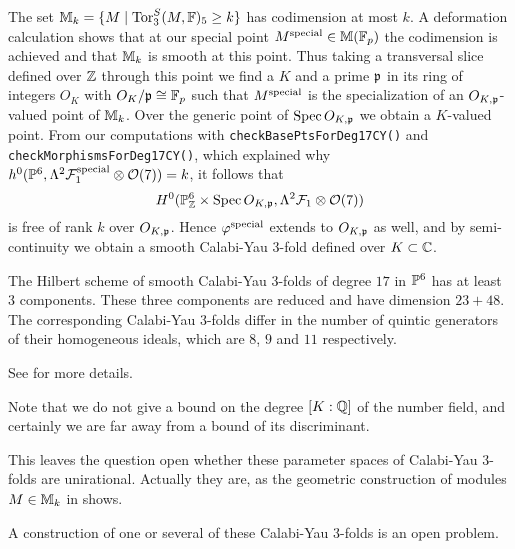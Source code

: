 The set
${\mathbb M}_k=\{ M \mid {\rm{Tor}}^S_3(M,{\mathbb F})_5 \ge k \}$ has codimension at most $k$.
A deformation calculation shows that at our special point
$M^{\rm special} \in {\mathbb M}({\mathbb F}_p)$ the codimension is achieved and that ${\mathbb M}_k$
is smooth at this point. 
Thus taking a transversal slice defined over ${\mathbb Z}$ through this point 
we find a  $K$ and a prime $\mathfrak p$ in its ring of integers $O_K$ 
with $O_K/\mathfrak p \cong {\mathbb F}_p$ such that 
$M^{\rm special}$ is the specialization of an $O_{K,\mathfrak p}$-valued point of ${\mathbb M}_k$. 
Over the generic point of $\operatorname{Spec} O_{K,\mathfrak p}$ we obtain a $K$-valued point. 
From our computations with {\tt checkBasePtsForDeg17CY()} and 
{\tt checkMorphismsForDeg17CY()},
which explained why $h^0({\mathbb P}^6,\Lambda^2 {\mathcal F}_1^{\rm special} \otimes {\mathcal O}(7))=k$,
it follows that 
$$H^0({\mathbb P}^6_{\mathbb Z}\times\operatorname{Spec} O_{K,\mathfrak p},\Lambda^2 {\mathcal F}_1 \otimes {\mathcal O}(7))$$
is free of rank $k$ over $O_{K,\mathfrak p}$.
Hence $\varphi^{\rm special}$ extends to $O_{K,\mathfrak p}$ as well,
and by semi-continuity we obtain a smooth Calabi-Yau 3-fold defined over
$K \subset {\mathbb C}$.

\begin{theorem}[\cite{CO:To}] The Hilbert scheme of smooth Calabi-Yau 3-folds of 
degree $17$ in 
${\mathbb P}^6$ has at least 3 components. These three components are reduced  and 
have dimension $23+48$. The corresponding Calabi-Yau 3-folds differ in the
number of quintic generators of their homogeneous ideals,
which are $8$, $9$ and $11$ respectively.   
\end{theorem}

See \cite{CO:To} for more details.
\medskip


Note that we do not give a bound on the degree $[K:{\mathbb Q}]$ of the number field,
and certainly we are far away from a bound of its discriminant.

This leaves the question open whether these parameter spaces of Calabi-Yau 
3-folds are unirational. Actually they are, as the geometric construction
of modules $M \in {\mathbb M}_k$ in \cite{CO:To} shows.

A construction of one or several  of these Calabi-Yau 3-folds
is an open problem. 

\nocite{CO:vB}




